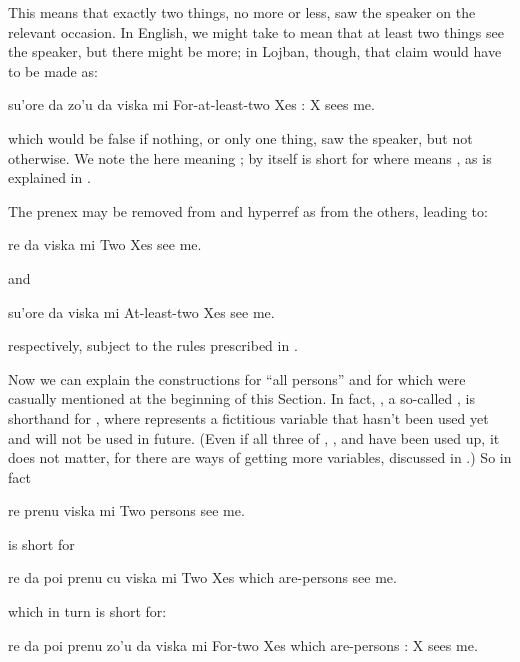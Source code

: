 This means that exactly two things, no more or less, saw the
    speaker on the relevant occasion. In English, we might take
     to mean that at least two things see the
    speaker, but there might be more; in Lojban, though, that claim
    would have to be made as:
\begin{example}
su'ore da zo'u da viska mi\n
For-at-least-two Xes : X sees me.
\end{example}

{\noindent}which would be false if nothing, or only one thing, saw the
    speaker, but not otherwise. We note the  here meaning
    ;  by itself is short for  where
     means , as is explained in . 

The prenex may be removed from  and hyperref as from the others, leading
    to:
\begin{example}
re da viska mi\n
Two Xes see me.
\end{example}

{\noindent}and
\begin{example}
su'ore da viska mi\n
At-least-two Xes see me.
\end{example}

{\noindent}respectively, subject to the rules prescribed in . 

Now we can explain the constructions  for ``all
    persons'' and  for  which were
    casually mentioned at the beginning of this Section. In fact,
    , a so-called , is
    shorthand for , where  represents a
    fictitious variable that hasn't been used yet and will not be
    used in future. (Even if all three of , , and
     have been used up, it does not matter, for there are
    ways of getting more variables, discussed in .) So in fact
\begin{example}
re prenu viska mi\n
Two persons see me.
\end{example}

{\noindent}is short for
\begin{example}
re da poi prenu cu viska mi\n
Two Xes which are-persons see me.
\end{example}

{\noindent}which in turn is short for:
\begin{example}
re da poi prenu zo'u da viska mi\n
For-two Xes which are-persons : X sees me.
\end{example}

